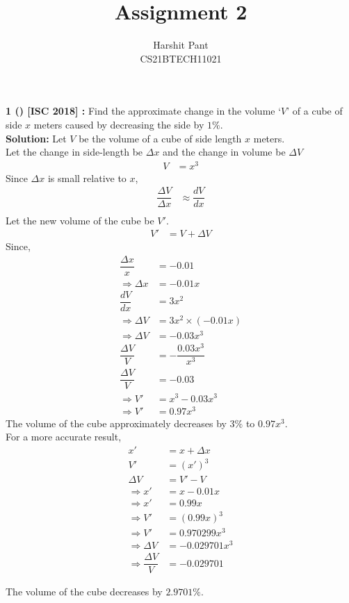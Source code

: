 \documentclass[journal,12pt,twocolumn]{IEEEtran}
\title{Assignment 2}
\author{Harshit Pant\\CS21BTECH11021}
\date{}
\begin{document}
\maketitle
\textbf{1 () [ISC 2018] :}
Find the approximate change in the volume `$V$' of a cube of side $x$ meters caused by decreasing the side by $1\%$.\\

\textbf{Solution:} Let $V$ be the volume of a cube of side length $x$ meters.\\
Let the change in side-length be $\Delta x$ and the change in volume be $\Delta V$
\begin{align}
V&=x^3
\end{align}
Since $\Delta x$ is small relative to $x$,
\addtolength{\jot}{.1in}
\begin{align}
\dfrac{\Delta V}{\Delta x}&\approx\dfrac{dV}{dx}\\
\end{align}
Let the new volume of the cube be $V'$.
\begin{align}
V'&=V+\Delta V
\end{align}
Since,
\begin{align}
\dfrac{\Delta x}{x}&=-0.01\\
\Rightarrow\Delta x&=-0.01x\\
\dfrac{dV}{dx}&=3x^2\\
\Rightarrow\Delta V&=3x^2\times(-0.01x)\\
\Rightarrow\Delta V&=-0.03x^3\\
\dfrac{\Delta V}{V}&=-\dfrac{0.03x^3}{x^3}\\
\dfrac{\Delta V}{V}&=-0.03\\
\Rightarrow V'&=x^3-0.03x^3\\
\Rightarrow V'&=0.97x^3
\end{align}
The volume of the cube approximately decreases by $3\%$  to $0.97x^3$.\\

For a more accurate result,
\begin{align}
x'&=x+\Delta x\\
V'&=(x')^3\\
\Delta V&=V'-V\\
\Rightarrow x'&=x-0.01x\\
\Rightarrow x'&=0.99x\\
\Rightarrow V'&=(0.99x)^3\\
\Rightarrow V'&=0.970299x^3\\
\Rightarrow \Delta V&=-0.029701x^3\\
\Rightarrow \dfrac{\Delta V}{V}&=-0.029701
\end{align}

The volume of the cube decreases by $2.9701\%$.
\end{document}
